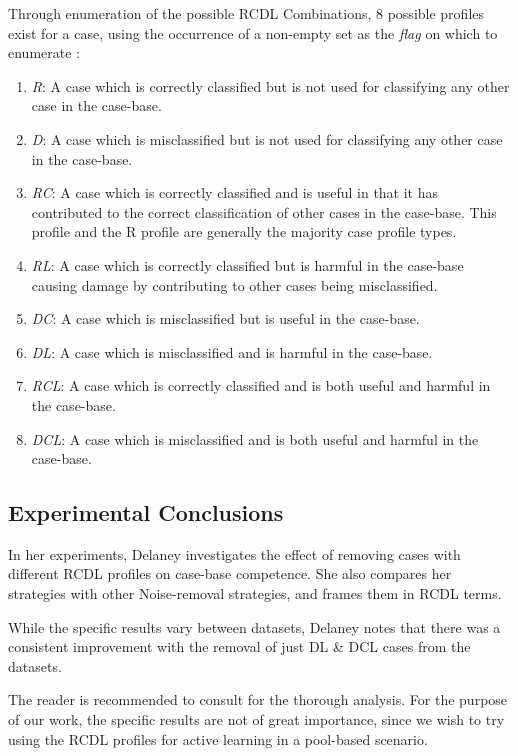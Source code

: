\documentclass[a4paper,11pt]{report}
\begin{document}
Through enumeration of the possible RCDL Combinations, 8 possible profiles exist for a case, using the occurrence of a non-empty set as the \emph{flag} on which to enumerate \citep{Delany2009}:

\begin{enumerate}
	\item \emph{R}: A case which is correctly classified but is not used for classifying any other case in the case-base.
	\item \emph{D}: A case which is misclassified but is not used for classifying any other case in the case-base.
	\item \emph{RC}: A case which is correctly classified and is useful in that it has contributed to the correct classification of other cases in the case-base. This profile and the R profile are generally the majority case profile types.
	\item \emph{RL}: A case which is correctly classified but is harmful in the case-base causing damage by contributing to other cases being misclassified.
	\item \emph{DC}: A case which is misclassified but is useful in the case-base. 
	\item \emph{DL}: A case which is misclassified and is harmful in the case-base.
	\item \emph{RCL}: A case which is correctly classified and is both useful and harmful in the case-base.
	\item \emph{DCL}: A case which is misclassified and is both useful and harmful in the case-base.
\end{enumerate}


\subsection{Experimental Conclusions}
In her experiments, Delaney investigates the effect of removing cases with different RCDL profiles on case-base competence. She also compares her strategies with other Noise-removal strategies, and frames them in RCDL terms.

While the specific results vary between datasets, Delaney notes that there was a consistent improvement with the removal of just DL \& DCL cases from the datasets. 

The reader is recommended to consult \citet{Delany2009} for the thorough analysis. For the purpose of our work, the specific results are not of great importance, since we wish to try using the RCDL profiles for active learning in a pool-based scenario.
\end{document}
